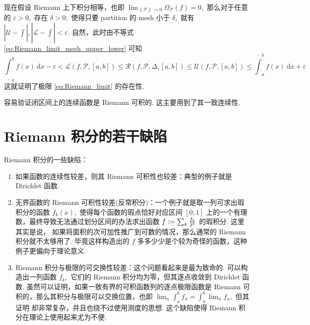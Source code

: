 \documentclass[12pt, a4paper, oneside]{book}
\numberwithin{figure}{section}
\theoremstyle{definition}
\begin{document}
现在假设 Riemann 上下积分相等，也即 $\lim_{\|\mathcal P\|\to 0}\Omega_{\mathcal P}(f)=0,$ 那么对于任意的 $\varepsilon>0,$ 存在 $\delta>0,$  使得只要 partition 的 mesh 小于 $\delta,$ 就有
$|\mathcal U-\overline{\int}|,|\mathcal L-\underline{\int}|< \varepsilon.$ 自然，此时由不等式 \eqref{eq:Riemann_limit_mesh_upper_lower} 可知
\begin{equation}
    \underline{\int}_a^b f(x)\ \mathrm dx-\varepsilon<\mathcal L(f,\mathcal P,[a,b])\leq \mathcal R(f,\mathcal P,\Delta,[a,b])\leq \mathcal U(f,\mathcal P,[a,b])\leq \overline{\int}_a^b f(x)\ \mathrm dx+\varepsilon
\end{equation}
这就证明了极限 \eqref{eq:Riemann_limit} 的存在性.

容易验证闭区间上的连续函数是 Riemann 可积的. 这主要用到了其一致连续性.

\section{Riemann 积分的若干缺陷}

Riemann 积分的一些缺陷：
\begin{enumerate}
    \item 如果函数的连续性较差，则其 Riemann 可积性也较差：典型的例子就是 Dirichlet 函数.
    \item 无界函数的 Riemann 可积性较差(反常积分)：一个例子就是取一列可求出瑕积分的函数 $f_k(x),$ 使得每个函数的瑕点恰好对应区间 $[0,1]$ 上的一个有理数，最终导致无法通过划分区间的办法求出函数 $f:=\sum_k {f_k\over 2^k}$ 的瑕积分. 这里其实是说，
          如果将面积的次可加性推广到可数的情况，那么通常的 Riemann 积分就不太够用了. 毕竟这样构造出的 $f$ 多多少少是个较为奇怪的函数，这种例子更偏向于理论意义. 
    \item Riemann 积分与极限的可交换性较差：这个问题看起来是最为致命的. 可以构造出一列函数 $f_k,$ 它们的 Riemann 积分均为零，但其逐点收敛到 Dirichlet 函数. 虽然可以证明，如果一致有界的可积函数列的逐点极限函数是 Riemann 可积的，那么其积分与极限可以交换位置，也即 $\lim_{n} \int_a^b f_n = \int_a^b \lim_n f_n,$ 但其证明 
          却非常复杂，并且也绕不过使用测度的思想. 这个缺陷使得 Riemann 积分在理论上使用起来尤为不便. 
\end{enumerate}
\end{document}
